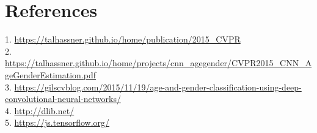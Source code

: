 \section{References}
1. \url{https://talhassner.github.io/home/publication/2015_CVPR} \\
2. \url{https://talhassner.github.io/home/projects/cnn_agegender/CVPR2015_CNN_AgeGenderEstimation.pdf} \\
3. \url{https://gilscvblog.com/2015/11/19/age-and-gender-classification-using-deep-convolutional-neural-networks/} \\
4. \url{http://dlib.net/} \\
5. \url{https://js.tensorflow.org/} \\

